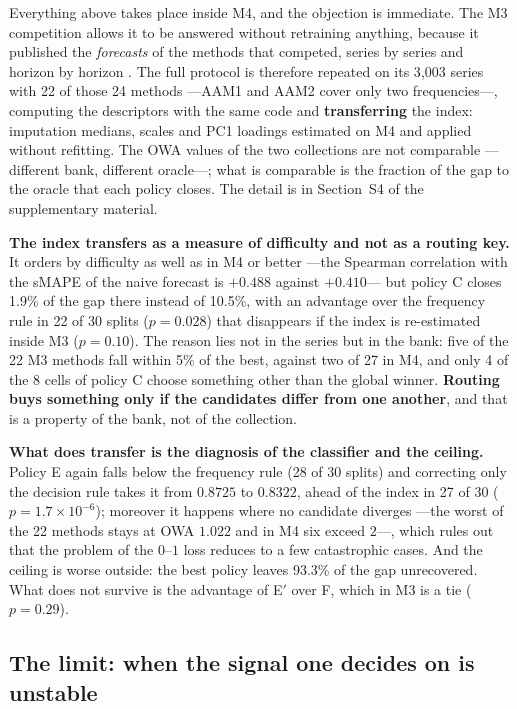 Everything above takes place inside M4, and the objection is immediate. The M3 competition
\cite{makridakis2000} allows it to be answered without retraining anything, because it
published the \emph{forecasts} of the methods that competed, series by series and horizon
by horizon \cite{mcomp}. The full protocol is therefore repeated on its 3{,}003 series
with 22 of those 24 methods ---AAM1 and AAM2 cover only two frequencies---, computing the
descriptors with the same code and \textbf{transferring} the index: imputation medians,
scales and PC1 loadings estimated on M4 and applied without refitting. The OWA values of
the two collections are not comparable ---different bank, different oracle---; what is
comparable is the fraction of the gap to the oracle that each policy closes. The detail is
in Section~S4 of the supplementary material.

\textbf{The index transfers as a measure of difficulty and not as a routing key.} It
orders by difficulty as well as in M4 or better ---the Spearman correlation with the sMAPE
of the naive forecast is $+0.488$ against $+0.410$--- but policy C closes 1.9\% of the gap
there instead of 10.5\%, with an advantage over the frequency rule in 22 of 30 splits
($p=0.028$) that disappears if the index is re-estimated inside M3 ($p=0.10$). The reason
lies not in the series but in the bank: five of the 22 M3 methods fall within 5\% of the
best, against two of 27 in M4, and only 4 of the 8 cells of policy C choose something
other than the global winner. \textbf{Routing buys something only if the candidates differ
from one another}, and that is a property of the bank, not of the collection.

\textbf{What does transfer is the diagnosis of the classifier and the ceiling.} Policy E
again falls below the frequency rule (28 of 30 splits) and correcting only the decision
rule takes it from $0.8725$ to $0.8322$, ahead of the index in 27 of 30
($p=1.7\times10^{-6}$); moreover it happens where no candidate diverges ---the worst of
the 22 methods stays at OWA $1.022$ and in M4 six exceed $2$---, which rules out that the
problem of the $0$--$1$ loss reduces to a few catastrophic cases. And the ceiling is worse
outside: the best policy leaves 93.3\% of the gap unrecovered. What does not survive is
the advantage of E$'$ over F, which in M3 is a tie ($p=0.29$).

\subsection{The limit: when the signal one decides on is
unstable}\label{sec:semillas}

